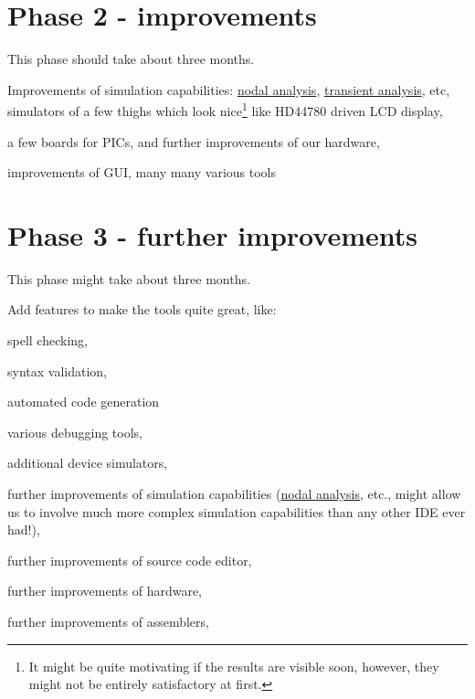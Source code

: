 \documentclass[a4paper,twoside,15pt]{book}
\begin{document}
	\section{Phase 2 - improvements}
		This phase should take about three months.
		\begin{dinglist}{73}
			\item Improvements of simulation capabilities: \href{http://www.ecircuitcenter.com/SpiceTopics/Nodal Analysis/Nodal Analysis.htm}{nodal analysis}, \href{http://www.ecircuitcenter.com/SpiceTopics/Transient Analysis/Transient Analysis.htm}{transient analysis}, etc, simulators of a few thighs which look nice\footnote{It might be quite motivating if the results are visible soon, however, they might not be entirely satisfactory at first.} like HD44780 driven LCD display,
			\item a few boards for PICs, and further improvements of our hardware,
			\item improvements of GUI, many many various tools
		\end{dinglist}

	\section{Phase 3 - further improvements}
		This phase might take about three months.
		\begin{dinglist}{73}
			\item Add features to make the tools quite great, like:
				\begin{dinglist}{75}
					\item spell checking,
					\item syntax validation,
					\item automated code generation
					\item various debugging tools,
					\item additional device simulators,
					\item further improvements of simulation capabilities (\href{http://en.wikipedia.org/wiki/Nodal_analysis}{nodal analysis}, etc., might allow us to involve much more complex simulation capabilities than any other IDE ever had!),
					\item further improvements of source code editor,
					\item further improvements of hardware,
					\item further improvements of assemblers,
				\end{dinglist}
		\end{dinglist}
\end{document}
